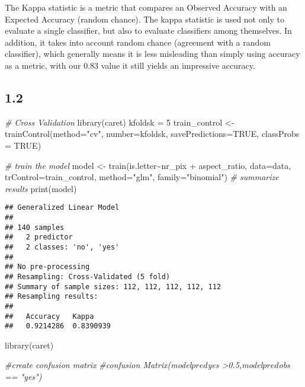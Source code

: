 \documentclass[
]{article}
\newenvironment{Shaded}{\begin{snugshade}}{\end{snugshade}}
\newcommand{\AttributeTok}[1]{\textcolor[rgb]{0.77,0.63,0.00}{#1}}
\newcommand{\CommentTok}[1]{\textcolor[rgb]{0.56,0.35,0.01}{\textit{#1}}}
\newcommand{\ConstantTok}[1]{\textcolor[rgb]{0.00,0.00,0.00}{#1}}
\newcommand{\DecValTok}[1]{\textcolor[rgb]{0.00,0.00,0.81}{#1}}
\newcommand{\FunctionTok}[1]{\textcolor[rgb]{0.00,0.00,0.00}{#1}}
\newcommand{\NormalTok}[1]{#1}
\newcommand{\OtherTok}[1]{\textcolor[rgb]{0.56,0.35,0.01}{#1}}
\newcommand{\SpecialCharTok}[1]{\textcolor[rgb]{0.00,0.00,0.00}{#1}}
\newcommand{\StringTok}[1]{\textcolor[rgb]{0.31,0.60,0.02}{#1}}
\begin{document}
The Kappa statistic is a metric that compares an Observed Accuracy with
an Expected Accuracy (random chance). The kappa statistic is used not
only to evaluate a single classifier, but also to evaluate classifiers
among themselves. In addition, it takes into account random chance
(agreement with a random classifier), which generally means it is less
misleading than simply using accuracy as a metric, with our 0.83 value
it still yields an impressive accuracy.

\hypertarget{section-1}{%
\subsection{1.2}\label{section-1}}

\begin{Shaded}
\begin{Highlighting}[]
\CommentTok{\# Cross Validation}
\FunctionTok{library}\NormalTok{(caret)}
\NormalTok{kfoldsk }\OtherTok{=} \DecValTok{5}
\NormalTok{train\_control }\OtherTok{\textless{}{-}} \FunctionTok{trainControl}\NormalTok{(}\AttributeTok{method=}\StringTok{"cv"}\NormalTok{, }\AttributeTok{number=}\NormalTok{kfoldsk, }
                              \AttributeTok{savePredictions=}\ConstantTok{TRUE}\NormalTok{, }
                              \AttributeTok{classProbs =} \ConstantTok{TRUE}\NormalTok{) }


\CommentTok{\# train the model}
\NormalTok{model }\OtherTok{\textless{}{-}} \FunctionTok{train}\NormalTok{(is.letter}\SpecialCharTok{\textasciitilde{}}\NormalTok{nr\_pix }\SpecialCharTok{+}\NormalTok{ aspect\_ratio, }\AttributeTok{data=}\NormalTok{data, }
               \AttributeTok{trControl=}\NormalTok{train\_control, }\AttributeTok{method=}\StringTok{"glm"}\NormalTok{, }\AttributeTok{family=}\StringTok{"binomial"}\NormalTok{)}
\CommentTok{\# summarize results}
\FunctionTok{print}\NormalTok{(model)}
\end{Highlighting}
\end{Shaded}

\begin{verbatim}
## Generalized Linear Model 
## 
## 140 samples
##   2 predictor
##   2 classes: 'no', 'yes' 
## 
## No pre-processing
## Resampling: Cross-Validated (5 fold) 
## Summary of sample sizes: 112, 112, 112, 112, 112 
## Resampling results:
## 
##   Accuracy   Kappa    
##   0.9214286  0.8390939
\end{verbatim}

\begin{Shaded}
\begin{Highlighting}[]
\FunctionTok{library}\NormalTok{(caret)}


\CommentTok{\#create confusion matrix}
\CommentTok{\#confusion Matrix(model$pred$yes \textgreater{}0.5,model$pred$obs == "yes")}
\end{Highlighting}
\end{Shaded}
\end{document}
